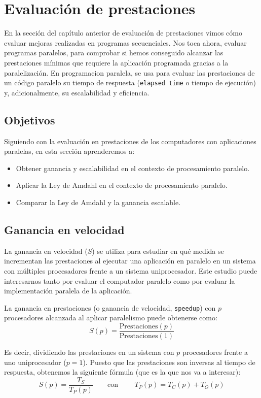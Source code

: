 \newpage
\section{Evaluación de prestaciones}
En la sección del capítulo anterior de evaluación de prestaciones vimos cómo evaluar mejoras realizadas en programas secuenciales. Nos toca ahora, evaluar programas paralelos, para comprobar si hemos conseguido alcanzar las prestaciones mínimas que requiere la aplicación programada gracias a la paralelización. En programacion paralela, se usa para evaluar las prestaciones de un código paralelo su tiempo de respuesta (\verb|elapsed time| o tiempo de ejecución) y, adicionalmente, su escalabilidad y eficiencia.

\subsection{Objetivos}
Siguiendo con la evaluación en prestaciones de los computadores con aplicaciones paralelas, en esta sección aprenderemos a:
\begin{itemize}
    \item Obtener ganancia y escalabilidad en el contexto de procesamiento paralelo.
    \item Aplicar la Ley de Amdahl en el contexto de procesamiento paralelo.
    \item Comparar la Ley de Amdahl y la ganancia escalable.
\end{itemize}

\subsection{Ganancia en velocidad}
La ganancia en velocidad ($S$) se utiliza para estudiar en qué medida se incrementan las prestaciones al ejecutar una aplicación en paralelo en un sistema con múltiples procesadores frente a un sistema uniprocesador. Este estudio puede interesarnos tanto por evaluar el computador paralelo como por evaluar la implementación paralela de la aplicación.

La ganancia en prestaciones (o ganancia de velocidad, \verb|speedup|) con $p$ procesadores alcanzada al aplicar paralelismo puede obtenerse como:
\begin{equation*}
    S(p) = \dfrac{\text{Prestaciones}(p)}{\text{Prestaciones}(1)}
\end{equation*}

Es decir, dividiendo las prestaciones en un sistema con $p$ procesadores frente a uno uniprocesador ($p=1$). Puesto que las prestaciones son inversas al tiempo de respuesta, obtenemos la siguiente fórmula (que es la que nos va a interesar):
\begin{equation}
    S(p) = \dfrac{T_S}{T_P(p)}\qquad \text{con\ }\qquad  T_P(p) = T_C(p) + T_O(p)
\end{equation}

